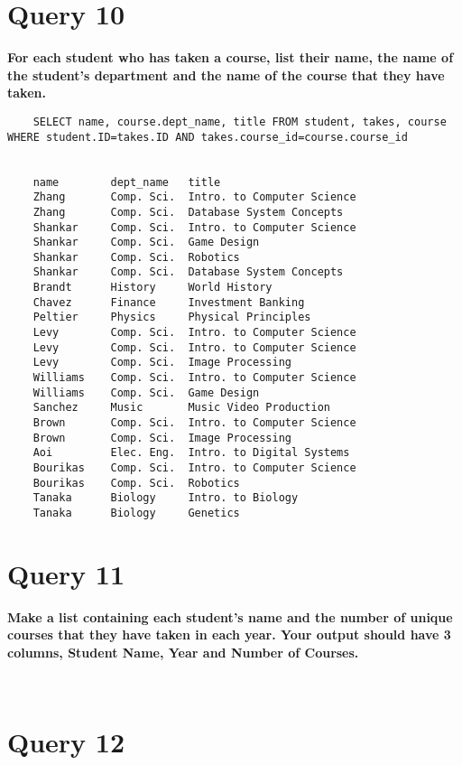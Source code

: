 \documentclass[letterpaper]{article}
\begin{document}
\section{Query 10}

    \textbf{For each student who has taken a course, list their name, the name of the student's department and the name of the course that they have taken.}
    \begin{lstlisting}
    SELECT name, course.dept_name, title FROM student, takes, course WHERE student.ID=takes.ID AND takes.course_id=course.course_id
    
    
    name    	dept_name	title	
    Zhang	    Comp. Sci.	Intro. to Computer Science	
    Zhang   	Comp. Sci.	Database System Concepts	
    Shankar 	Comp. Sci.	Intro. to Computer Science	
    Shankar 	Comp. Sci.	Game Design	
    Shankar 	Comp. Sci.	Robotics	
    Shankar 	Comp. Sci.	Database System Concepts	
    Brandt  	History	    World History	
    Chavez  	Finance	    Investment Banking	
    Peltier 	Physics	    Physical Principles	
    Levy    	Comp. Sci.	Intro. to Computer Science	
    Levy    	Comp. Sci.	Intro. to Computer Science	
    Levy    	Comp. Sci.	Image Processing	
    Williams	Comp. Sci.	Intro. to Computer Science	
    Williams	Comp. Sci.	Game Design	
    Sanchez 	Music	    Music Video Production	
    Brown   	Comp. Sci.	Intro. to Computer Science	
    Brown   	Comp. Sci.	Image Processing	
    Aoi 	    Elec. Eng.	Intro. to Digital Systems	
    Bourikas    Comp. Sci.	Intro. to Computer Science	
    Bourikas    Comp. Sci.	Robotics	
    Tanaka  	Biology	    Intro. to Biology	
    Tanaka  	Biology	    Genetics       
    \end{lstlisting}
        
\section{Query 11}

    \textbf{Make a list containing each student's name and the number of unique courses that they have taken in each year.  Your output should have 3 columns, Student Name, Year and Number of Courses.}
    \begin{lstlisting}
        
    \end{lstlisting}
        
\section{Query 12}
\end{document}

